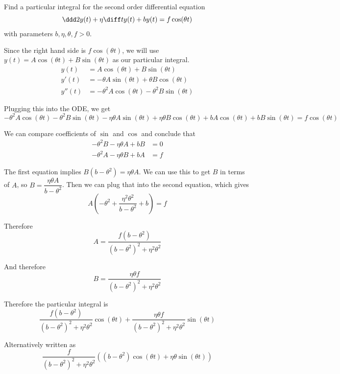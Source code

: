 \documentclass[a4paper]{article}
\begin{document}

\begin{questionbody}
Find a particular integral for the second order differential equation \[
\ddd 2{} y(t) + \eta \diff t y(t) + b y(t) = f \cos (\theta t)
\] with parameters $b, \eta, \theta, f > 0$.
\end{questionbody}

Since the right hand side is $f \cos(\theta t)$, we will use $y(t) = A \cos(\theta t) + B \sin(\theta t)$ as our particular integral.
\begin{align*}
    y(t)   &= A \cos(\theta t) + B \sin(\theta t) \\
    y'(t)  &= -\theta A \sin(\theta t) + \theta B \cos(\theta t) \\
    y''(t) &= -\theta^2 A \cos(\theta t) - \theta^2 B \sin(\theta t)
\end{align*}

Plugging this into the ODE, we get \[
-\theta^2 A \cos(\theta t) - \theta^2 B \sin(\theta t) -\eta\theta A \sin(\theta t) + \eta\theta B \cos(\theta t) + bA \cos(\theta t) + bB \sin(\theta t) = f \cos(\theta t)
\]

We can compare coefficients of $\sin$ and $\cos$ and conclude that \begin{align*}
    -\theta^2 B - \eta\theta A + bB &= 0 \\
    -\theta^2 A - \eta\theta B + bA &= f
\end{align*}

The first equation implies $B(b - \theta^2) = \eta\theta A$. We can use this to get $B$ in terms of $A$, so $B = \dfrac{\eta\theta A}{b - \theta^2}$. Then we can plug that into the second equation, which gives \[
A \left(-\theta^2 + \frac{\eta^2 \theta^2}{b - \theta^2} + b\right) = f
\]

Therefore \[ A = \frac{f (b - \theta^2)}{{(b - \theta^2)}^2 + \eta^2 \theta^2} \]

And therefore \[ B = \frac{\eta \theta f}{{(b - \theta^2)}^2 + \eta^2 \theta^2} \]

Therefore the particular integral is \[
\frac{f (b - \theta^2)}{{(b - \theta^2)}^2 + \eta^2 \theta^2} \cos(\theta t) + \frac{\eta \theta f}{{(b - \theta^2)}^2 + \eta^2 \theta^2} \sin (\theta t)
\]

Alternatively written as \[
\frac{f}{{(b - \theta^2)}^2 + \eta^2 \theta^2} \left( (b - \theta^2) \cos(\theta t) + \eta \theta \sin(\theta t) \right)
\]
\end{document}
